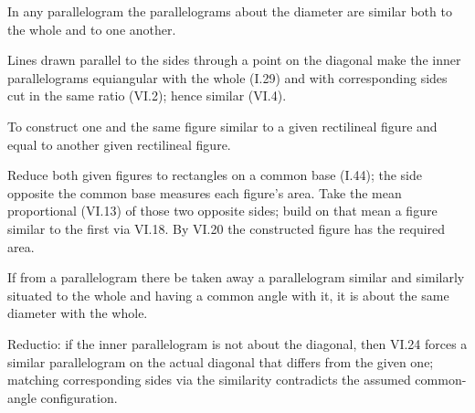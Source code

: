 \documentclass{rrxiv}
\begin{document}
\begin{claim}
\label{prop:VI.24}
In any parallelogram the parallelograms about the diameter are
similar both to the whole and to one another.
\end{claim}
\begin{evidence}[Proof of VI.24]
\label{ev:VI.24}
Lines drawn parallel to the sides through a point on the diagonal
make the inner parallelograms equiangular with the whole (I.29) and
with corresponding sides cut in the same ratio (VI.2); hence similar
(VI.4).
\end{evidence}

\begin{claim}
\label{prop:VI.25}
To construct one and the same figure similar to a given rectilineal
figure and equal to another given rectilineal figure.
\end{claim}
\begin{evidence}[Proof of VI.25]
\label{ev:VI.25}
Reduce both given figures to rectangles on a common base (I.44);
the side opposite the common base measures each figure's area.  Take
the mean proportional (VI.13) of those two opposite sides; build on
that mean a figure similar to the first via VI.18.  By VI.20 the
constructed figure has the required area.
\end{evidence}

\begin{claim}
\label{prop:VI.26}
If from a parallelogram there be taken away a parallelogram similar
and similarly situated to the whole and having a common angle with
it, it is about the same diameter with the whole.
\end{claim}
\begin{evidence}[Proof of VI.26]
\label{ev:VI.26}
Reductio: if the inner parallelogram is not about the diagonal, then
VI.24 forces a similar parallelogram on the actual diagonal that
differs from the given one; matching corresponding sides via the
similarity contradicts the assumed common-angle configuration.
\end{evidence}
\end{document}
